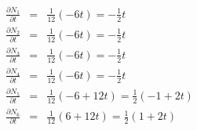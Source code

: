 \begin{eqnarray}
\frac{\partial N_1}{\partial t} &=& \frac{1}{12} (-6t) = -\frac{1}{2}t \\
\frac{\partial N_2}{\partial t} &=& \frac{1}{12} (-6t) = -\frac{1}{2}t \\
\frac{\partial N_3}{\partial t} &=& \frac{1}{12} (-6t) = -\frac{1}{2}t \\
\frac{\partial N_4}{\partial t} &=& \frac{1}{12} (-6t) = -\frac{1}{2}t \\
\frac{\partial N_5}{\partial t} &=& \frac{1}{12} (-6+12t) = \frac{1}{2} (-1+2t) \\ 
\frac{\partial N_6}{\partial t} &=& \frac{1}{12} (6+12t) = \frac{1}{2} (1+2t) 
\end{eqnarray}



